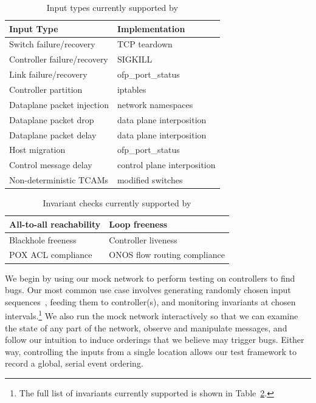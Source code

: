 \begin{table}
\centering
\begin{tabular}{|l|l|}
\hline
Input Type &  Implementation \\
\hline
\hline
Switch failure/recovery & TCP teardown \\
\hline
Controller failure/recovery & SIGKILL \\
\hline
Link failure/recovery & ofp\_port\_status \\
\hline
Controller partition & iptables \\
\hline
Dataplane packet injection & network namespaces \\
\hline
Dataplane packet drop & data plane interposition \\
\hline
Dataplane packet delay & data plane interposition \\
\hline
Host migration & ofp\_port\_status \\
\hline
Control message delay & control plane interposition \\
\hline
Non-deterministic TCAMs & modified switches \\
\hline
\end{tabular}
\caption{Input types currently supported by \projectname}
\label{tab:inputs}
\end{table}

\begin{table}
\centering
\begin{tabular}{|l|l|}
\hline
All-to-all reachability & Loop freeness \\
\hline
Blackhole freeness & Controller liveness \\
\hline
POX ACL compliance & ONOS flow routing compliance \\
\hline
\end{tabular}
\caption{Invariant checks currently supported by \projectname}
\label{tab:invariants}
\end{table}

We begin by using our mock network to perform testing on controllers to find
bugs. Our most common use case involves generating randomly chosen input
sequences~\cite{Miller:1990:ESR:96267.96279}, feeding them to controller(s),
and monitoring
invariants at chosen intervals.\footnote{The full list of invariants currently
supported is shown in Table~\ref{tab:invariants}.}
We also run the mock network interactively
so that we can examine the state of any part of the network,
observe and manipulate messages, and follow our
intuition to induce orderings that we believe may trigger bugs.
Either way, controlling the inputs from a single location
allows our test framework to record a global, serial
event ordering.

